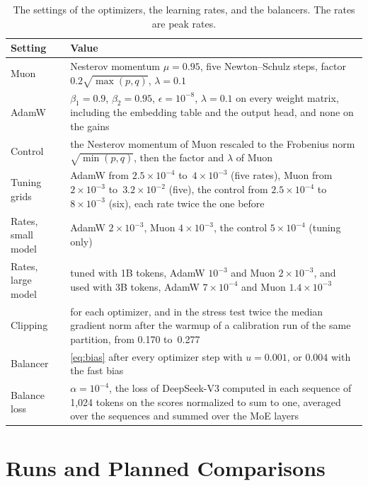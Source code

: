 \documentclass[11pt, a4paper]{article}
\begin{document}
\begin{table}[ht]
  \centering
  \caption{The settings of the optimizers, the learning rates, and the balancers. The rates are peak rates.}
  \label{tab:optimizer}
  \small
  \begin{tabular}{@{}l>{\raggedright\arraybackslash}p{12.25cm}@{}}
    \toprule
    Setting & Value \\
    \midrule
    Muon & Nesterov momentum $\mu = 0.95$, five Newton--Schulz steps, factor~$0.2 \sqrt{\max(p, q)}$, $\lambda = 0.1$ \\ \addlinespace[2pt]
    AdamW & $\beta_1 = 0.9$, $\beta_2 = 0.95$, $\epsilon = 10^{-8}$, $\lambda = 0.1$ on every weight matrix, including the embedding table and the output head, and none on the gains \\ \addlinespace[2pt]
    Control & the Nesterov momentum of Muon rescaled to the Frobenius norm $\sqrt{\min(p, q)}$, then the factor and $\lambda$ of Muon \\ \addlinespace[2pt]
    Tuning grids & AdamW from $2.5 \times 10^{-4}$ to~$4 \times 10^{-3}$ (five rates), Muon from $2 \times 10^{-3}$ to~$3.2 \times 10^{-2}$ (five), the control from $2.5 \times 10^{-4}$ to~$8 \times 10^{-3}$ (six), each rate twice the one before \\ \addlinespace[2pt]
    Rates, small model & AdamW $2 \times 10^{-3}$, Muon $4 \times 10^{-3}$, the control $5 \times 10^{-4}$ (tuning only) \\ \addlinespace[2pt]
    Rates, large model & tuned with 1B tokens, AdamW $10^{-3}$ and Muon $2 \times 10^{-3}$, and used with 3B tokens, AdamW $7 \times 10^{-4}$ and Muon $1.4 \times 10^{-3}$ \\ \addlinespace[2pt]
    Clipping & 1.0 for each optimizer, and in the stress test twice the median gradient norm after the warmup of a calibration run of the same partition, from 0.170 to~0.277 \\ \addlinespace[2pt]
    Balancer & \cref{eq:bias} after every optimizer step with $u = 0.001$, or $0.004$ with the fast bias \\ \addlinespace[2pt]
    Balance loss & $\alpha = 10^{-4}$, the loss of DeepSeek-V3 computed in each sequence of 1,024 tokens on the scores normalized to sum to one, averaged over the sequences and summed over the MoE layers \\
    \bottomrule
  \end{tabular}
\end{table}

\section{Runs and Planned Comparisons}
\label{app:program}
\end{document}
